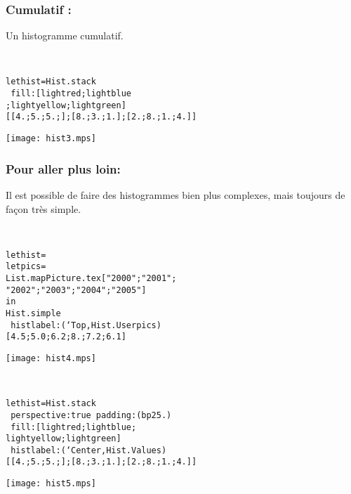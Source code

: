 \documentclass[a4paper,12pt]{article}
\begin{document}
\subsubsection{Cumulatif :} 
Un histogramme cumulatif.

~\\

\begin{minipage}{0.5\linewidth}
  \begin{alltt}
    let hist = Hist.stack 
    ~fill:[lightred;lightblue
      ;lightyellow;lightgreen]
    [[4.;5.;5.;]; [8.;3.;1.]; [2.;8.;1.;4.]]
  \end{alltt}
\end{minipage}
\begin{minipage}{0.5\linewidth}
\begin{center}
\texttt{[image: hist3.mps]}
\end{center}
\end{minipage}

\subsubsection{Pour aller plus loin:}
Il est possible de faire des histogrammes bien plus complexes, mais toujours de façon très simple.

~\\

\begin{minipage}{0.5\linewidth}
  \begin{alltt}
    let hist =
    let pics =
    List.map Picture.tex ["2000";"2001";
      "2002";"2003";"2004";"2005"]
    in
    Hist.simple 
    ~histlabel:(`Top, Hist.User pics)
    [4.5;5.0;6.2;8.;7.2;6.1]
  \end{alltt}
\end{minipage}
\begin{minipage}{0.5\linewidth}
\begin{center}
\texttt{[image: hist4.mps]}
\end{center}
\end{minipage}

~\\

\begin{minipage}{0.5\linewidth}
  \begin{alltt}
    let hist = Hist.stack
    ~perspective:true ~padding:(bp 25.)
    ~fill:[lightred;lightblue;
      lightyellow;lightgreen]
    ~histlabel:(`Center, Hist.Values)
    [[4.;5.;5.;]; [8.;3.;1.]; [2.;8.;1.;4.]]
  \end{alltt}
\end{minipage}
\begin{minipage}{0.5\linewidth}
\begin{center}
\texttt{[image: hist5.mps]}
\end{center}
\end{minipage}
\end{document}
